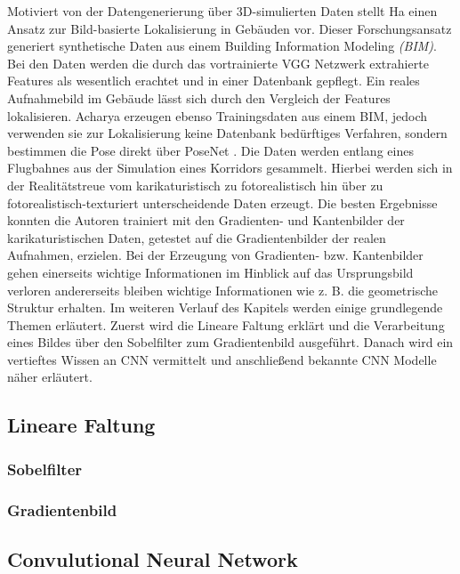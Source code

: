 Motiviert von der Datengenerierung über 3D-simulierten Daten stellt Ha \etal\cite{haImagebasedIndoorLocalization2018} einen Ansatz zur Bild-basierte Lokalisierung in Gebäuden vor. Dieser Forschungsansatz generiert synthetische Daten aus einem Building Information Modeling \textit{(BIM)}. Bei den Daten werden die durch das vortrainierte VGG Netzwerk \cite{simonyanVeryDeepConvolutional2014} extrahierte Features als wesentlich erachtet und in einer Datenbank gepflegt. Ein reales Aufnahmebild im Gebäude lässt sich durch den Vergleich der Features lokalisieren. Acharya \etal\cite{acharyaBIMPoseNetIndoorCamera2019, acharyaMODELLINGUNCERTAINTYSINGLE2019} erzeugen ebenso Trainingsdaten aus einem BIM, jedoch verwenden sie zur Lokalisierung keine Datenbank bedürftiges Verfahren, sondern bestimmen die Pose direkt über PoseNet \cite{kendallPoseNetConvolutionalNetwork2015}. Die Daten werden entlang eines Flugbahnes aus der Simulation eines Korridors gesammelt. Hierbei werden sich in der Realitätstreue vom karikaturistisch zu fotorealistisch hin über zu fotorealistisch-texturiert unterscheidende Daten erzeugt. Die besten Ergebnisse konnten die Autoren trainiert mit den Gradienten- und Kantenbilder der karikaturistischen Daten, getestet auf die Gradientenbilder der realen Aufnahmen, erzielen. Bei der Erzeugung von Gradienten- bzw. Kantenbilder gehen einerseits wichtige Informationen im Hinblick auf das Ursprungsbild verloren andererseits bleiben wichtige Informationen wie z. B. die geometrische Struktur erhalten.
\newline
\newline
Im weiteren Verlauf des Kapitels werden einige grundlegende Themen erläutert. Zuerst wird die Lineare Faltung erklärt und die Verarbeitung eines Bildes über den Sobelfilter zum Gradientenbild ausgeführt. Danach wird ein vertieftes Wissen an CNN vermittelt und anschließend bekannte CNN Modelle näher erläutert.

\subsection{Lineare Faltung}
\subsubsection{Sobelfilter}
\subsubsection{Gradientenbild}
\subsection{Convulutional Neural Network}
